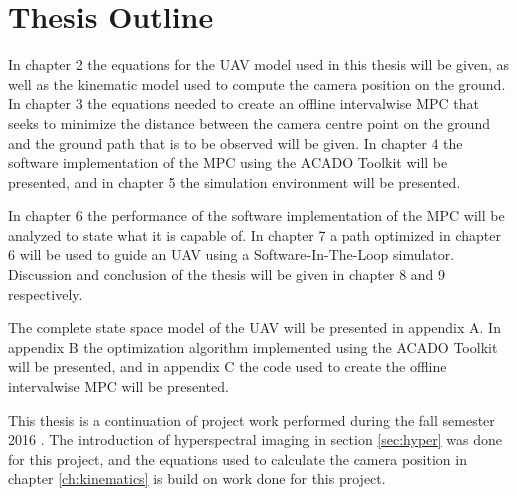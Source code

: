 \section{Thesis Outline}

In chapter 2 the equations for the UAV model used in this thesis will be given, as well as the kinematic model used to compute the camera position on the ground. In chapter 3 the equations needed to create an offline intervalwise MPC that seeks to minimize the distance between the camera centre point on the ground and the ground path that is to be observed will be given. In chapter 4 the software implementation of the MPC using the ACADO Toolkit will be presented, and in chapter 5 the simulation environment will be presented.

In chapter 6 the performance of the software implementation of the MPC will be analyzed to state what it is capable of. In chapter 7 a path optimized in chapter 6 will be used to guide an UAV using a Software-In-The-Loop simulator. Discussion and conclusion of the thesis will be given in chapter 8 and 9 respectively.

The complete state space model of the UAV will be presented in appendix A. In appendix B the optimization algorithm implemented using the ACADO Toolkit will be presented, and in appendix C the code used to create the offline intervalwise MPC will be presented.

This thesis is a continuation of project work performed during the fall semester 2016 \cite{prosjekt}. The introduction of hyperspectral imaging in section \ref{sec:hyper} was done for this project, and the equations used to calculate the camera position in chapter \ref{ch:kinematics} is build on work done for this project.